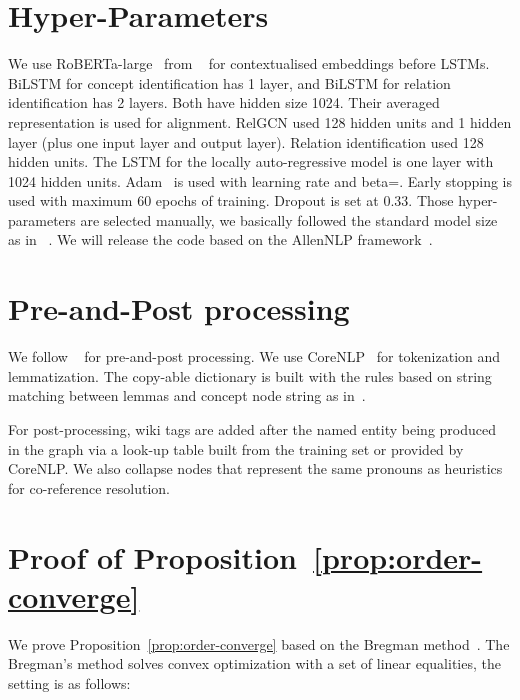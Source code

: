 \documentclass[11pt]{article}
\begin{document}
\section{Hyper-Parameters }
We use RoBERTa-large~\cite{Liu2019RoBERTaAR} from ~ for contextualised embeddings before LSTMs.  BiLSTM for concept identification has 1 layer, and BiLSTM for relation identification has 2 layers. Both have hidden size 1024. Their averaged representation is used for alignment. RelGCN used 128 hidden units and 1 hidden layer (plus one input layer and output layer). Relation identification used 128 hidden units. The LSTM for the locally auto-regressive model is one layer with 1024 hidden units. Adam~\cite{Kingma2015AdamAM} is used with learning rate  and beta=. Early stopping is used with maximum 60 epochs of training. Dropout is set at 0.33. Those hyper-parameters are selected manually, we basically followed the standard model size as in ~\cite{lyu-titov-2018-amr,Zhang2019AMRPA}. We will release the code based on the AllenNLP framework~\cite{Gardner2018AllenNLPAD}.

\section{Pre-and-Post processing}
We follow ~ for pre-and-post processing. We use CoreNLP~\cite{manning-EtAl:2014:P14-5} for tokenization and lemmatization. The copy-able dictionary is built with the rules based on string matching between lemmas and concept node string as in~. 

For post-processing, wiki tags are added after the named entity being produced in the graph via a look-up table built from the training set or provided by CoreNLP. We also collapse nodes that represent the same pronouns as heuristics for co-reference resolution.
    
\section{Proof of Proposition~\ref{prop:order-converge}} \label{prof:order-converge}
We prove Proposition~\ref{prop:order-converge} based on the Bregman method~\cite{Bregman1967TheRM}. The Bregman's  method solves convex optimization with a set of linear equalities, the setting is as follows:
\end{document}
